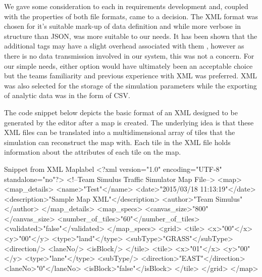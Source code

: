 We gave some consideration to each in requirements development and, coupled with the properties of both file formats, came to a decision.  The XML format was chosen for it's suitable mark-up of data definition and while more verbose in structure than JSON, was more suitable to our needs.  It has been shown that the additional tags may have a slight overhead associated with them \cite{codeproject2013}, however as there is no data transmission involved in our system, this was not a concern.  For our simple needs, either option would have ultimately been an acceptable choice but the teams familiarity and previous experience with XML was preferred.  XML was also selected for the storage of the simulation parameters while the exporting of analytic data was in the form of CSV. 

The code snippet below depicts the basic format of an XML designed to be generated by the editor after a map is created. The underlying idea is that these XML files can be translated into a multidimensional array of tiles that the simulation can reconstruct the map with. Each tile in the XML file holds information about the attributes of each tile on the map.

\begin{xml-code}{Snippet from XML Map}{label}
\label{code:xmlsnippet}
<?xml version="1.0" encoding="UTF-8" standalone="no"?>
<!--Team Simulus Traffic Simulator Map File-->
<map>
  <map_details>
    <name>"Test"</name>
    <date>"2015/03/18 11:13:19"</date>
    <description>"Sample Map XML"</description>
    <author>"Team Simulus"</author>
  </map_details>
  <map_specs>
    <canvas_size>"800"</canvas_size>
    <number_of_tiles>"60"</number_of_tiles>
    <validated>"false"</validated>
  </map_specs>
  <grid>
    <tile>
      <x>"00"</x>
      <y>"00"</y>
      <type>"land"</type>
      <subType>"GRASS"</subType>
      <direction/>
      <laneNo/>
      <isBlock/>
    </tile>
    <tile>
      <x>"01"</x>
      <y>"00"</y>
      <type>"lane"</type>
      <subType/>
      <direction>"EAST"</direction>
      <laneNo>"0"</laneNo>
      <isBlock>"false"</isBlock>
    </tile>
  </grid>
</map>
\end{xml-code}


